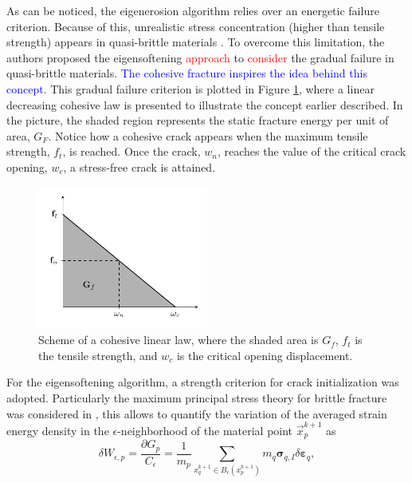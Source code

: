 \documentclass[preprint,12pt,a4paper]{elsarticle}
\newcommand{\tens}[1]{
  \ensuremath{\mathbf{{#1}}}
}
\begin{document}
As can be noticed, the eigenerosion algorithm relies over an energetic
failure criterion. Because of this, unrealistic stress
concentration (higher than tensile strength) appears in quasi-brittle
materials \cite{Navas_2017_ES}. To overcome this limitation, the authors \cite{Navas_2017_ES} proposed the eigensoftening \textcolor{red}{approach} to \textcolor{red}{consider} the gradual failure in quasi-brittle materials. \textcolor{blue}{The cohesive fracture inspires the idea behind this concept}. This gradual
failure criterion is plotted in Figure \ref{fig:Damage-ft-wc}, where
a linear decreasing cohesive law is presented to illustrate the
concept earlier described. In the picture, the shaded region represents
the static fracture energy per unit of area, $G_F$. Notice how a
cohesive crack appears when the maximum tensile strength, $f_t$, is
reached. Once the crack, $w_n$, reaches the value of the critical
crack opening, $w_c$, a stress-free crack is attained.
\begin{figure}
  \centering
  \includegraphics[width=0.5\textwidth]{Figure-Damage}
  \caption{Scheme of a cohesive linear law, where the shaded area is
    $G_f$, $f_t$ is the tensile strength, and $w_c$ is the critical
    opening displacement.}
  \label{fig:Damage-ft-wc}
\end{figure}
For the eigensoftening algorithm, a strength criterion for crack
initialization was adopted. Particularly the maximum principal stress
theory for brittle fracture was considered in \cite{Navas_2017_ES},
this allows to quantify the variation of the averaged strain energy density in the
$\epsilon$-neighborhood of the material point $\vec{x}_p^{k+1}$ as
\begin{equation}
  \label{eq:variation-averaged-strain-energy-density}
  \delta W_{\epsilon,p} = \frac{\partial G_p}{C_{\epsilon}} =
  \frac{1}{m_p} \sum_{x_q^{k+1} \in
  B_{\epsilon}(x_p^{k+1})} m_q \tens{\sigma}_{q,I} \delta \tens{\varepsilon}_q,
\end{equation}
\end{document}

